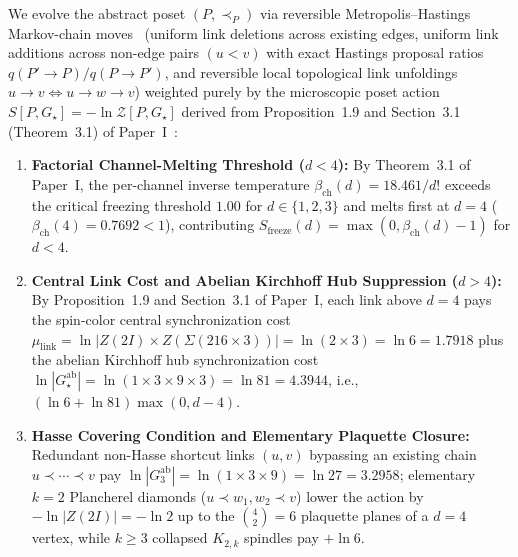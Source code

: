 \documentclass[11pt,a4paper]{article}
\theoremstyle{definition}
\theoremstyle{remark}
\newcommand{\Gthree}{G_3}
\newcommand{\Gstar}{G_\star}
\begin{document}
We evolve the abstract poset $(P, \prec_P)$ via reversible Metropolis--Hastings Markov-chain moves~\cite{Surya2012} (uniform link deletions across existing edges, uniform link additions across non-edge pairs $(u < v)$ with exact Hastings proposal ratios $q(P'\to P)/q(P\to P')$, and reversible local topological link unfoldings $u \to v \Longleftrightarrow u \to w \to v$) weighted purely by the microscopic poset action $S[P, \Gstar] = -\ln\mathcal{Z}[P, \Gstar]$ derived from Proposition~1.9 and Section~3.1 (Theorem~3.1) of Paper~I~\cite{PaperI}:
\begin{enumerate}
    \item \textbf{Factorial Channel-Melting Threshold ($d < 4$):} By Theorem~3.1 of Paper~I, the per-channel inverse temperature $\beta_{\mathrm{ch}}(d) = 18.461 / d!$ exceeds the critical freezing threshold $1.00$ for $d \in \{1, 2, 3\}$ and melts first at $d = 4$ ($\beta_{\mathrm{ch}}(4) = 0.7692 < 1$), contributing $S_{\mathrm{freeze}}(d) = \max(0, \beta_{\mathrm{ch}}(d) - 1)$ for $d < 4$.
    \item \textbf{Central Link Cost and Abelian Kirchhoff Hub Suppression ($d > 4$):} By Proposition~1.9 and Section~3.1 of Paper~I, each link above $d = 4$ pays the spin-color central synchronization cost $\mu_{\mathrm{link}} = \ln|Z(2I) \times Z(\Sigma(216\times 3))| = \ln(2 \times 3) = \ln 6 = 1.7918$ plus the abelian Kirchhoff hub synchronization cost $\ln|\Gstar^{\mathrm{ab}}| = \ln(1 \times 3 \times 9 \times 3) = \ln 81 = 4.3944$, i.e., $(\ln 6 + \ln 81)\max(0, d - 4)$.
    \item \textbf{Hasse Covering Condition and Elementary Plaquette Closure:} Redundant non-Hasse shortcut links $(u, v)$ bypassing an existing chain $u \prec \cdots \prec v$ pay $\ln|\Gthree^{\mathrm{ab}}| = \ln(1 \times 3 \times 9) = \ln 27 = 3.2958$; elementary $k = 2$ Plancherel diamonds ($u \prec w_1, w_2 \prec v$) lower the action by $-\ln|Z(2I)| = -\ln 2$ up to the $\binom{4}{2} = 6$ plaquette planes of a $d = 4$ vertex, while $k \ge 3$ collapsed $K_{2,k}$ spindles pay $+\ln 6$.
\end{enumerate}
\end{document}
